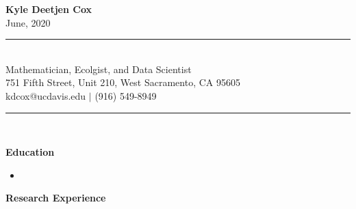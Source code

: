 \documentclass[letterpaper,12pt]{article}
\begin{document}
\begin{center}
\fontsize{16}{19.2}
\textbf{Kyle Deetjen Cox}\\
\fontsize{12}{14.4}
June, 2020\\
\noindent\rule{\linewidth}{0.4pt}\\
Mathematician, Ecolgist, and Data Scientist\\
751 Fifth Street, Unit 210, West Sacramento, CA 95605\\
kdcox@ucdavis.edu $\vert$ (916) 549-8949\\
\noindent\rule{\linewidth}{0.4pt}\\
\end{center}
\textbf{Education}
\begin{itemize}
\item[]
\end{itemize}
\vspace*{1\baselineskip}
\textbf{Research Experience}
\end{document}

